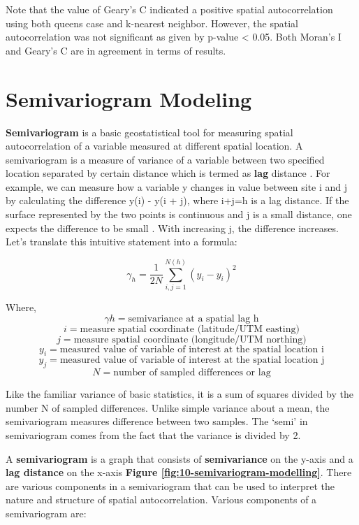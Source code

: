 \documentclass[
]{book}
\begin{document}
Note that the value of Geary's C indicated a positive spatial autocorrelation using both queens case and k-nearest neighbor. However, the spatial autocorrelation was not significant as given by p-value \textless{} 0.05. Both Moran's I and Geary's C are in agreement in terms of results.

\hypertarget{semivariogram-modeling}{%
\section{Semivariogram Modeling}\label{semivariogram-modeling}}

\textbf{Semivariogram} is a basic geostatistical tool for measuring spatial autocorrelation of a variable measured at different spatial location. A semivariogram is a measure of variance of a variable between two specified location separated by certain distance which is termed as \textbf{lag} distance \citep{isaaks_introduction_1989}. For example, we can measure how a variable y changes in value between site i and j by calculating the difference y(i) - y(i + j), where i+j=h is a lag distance. If the surface represented by the two points is continuous and j is a small distance, one expects the difference to be small \citep{isaaks_introduction_1989}. With increasing j, the difference increases. Let's translate this intuitive statement into a formula:

\[\gamma_{h}= \frac{1}{2N} \sum_{i,j= 1}^{N(h)}{({y_i} - y_i)}^2\]

Where, \[\gamma{h}=\text{semivariance at a spatial lag h}\]
\[ i=\text{measure spatial coordinate (latitude/UTM easting)}\]
\[ j=\text{measure spatial coordinate (longitude/UTM northing)}\]
\[y_{i}=\text{measured value of variable of interest at the spatial location i} \]
\[y_{j}=\text{measured value of variable of interest at the spatial location j} \]
\[N=\text{number of sampled differences or lag} \]

Like the familiar variance of basic statistics, it is a sum of squares divided by the number N of sampled differences. Unlike simple variance about a mean, the semivariogram measures difference between two samples. The `semi' in semivariogram comes from the fact that the variance is divided by 2.

A \textbf{semivariogram} is a graph that consists of \textbf{semivariance} on the y-axis and a \textbf{lag distance} on the x-axis \textbf{Figure \ref{fig:10-semivariogram-modelling}}. There are various components in a semivariogram that can be used to interpret the nature and structure of spatial autocorrelation. Various components of a semivariogram are:
\end{document}
